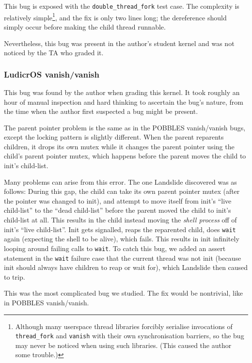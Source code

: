 This bug is exposed with the \texttt{double\_thread\_fork} test case. The complexity is relatively simple\footnote{
Although many userspace thread libraries forcibly serialise invocations of \texttt{thread\_fork} and \texttt{vanish} with their own synchronisation barriers, so the bug may never be noticed when using such libraries. (This caused the author some trouble.)},
and the fix is only two lines long; the dereference should simply occur before making the child thread runnable.

Nevertheless, this bug was present in the author's student kernel and was not noticed by the TA who graded it.

\subsubsection{LudicrOS vanish/vanish}
\label{sec:eval-ludicros-vanish}

This bug was found by the author when grading this kernel. It took roughly an hour of manual inspection and hard thinking to ascertain the bug's nature, from the time when the author first suspected a bug might be present.

The parent pointer problem is the same as in the POBBLES vanish/vanish bugs, except the locking pattern is slightly different. When the parent reparents children, it drops its own mutex while it changes the parent pointer using the child's parent pointer mutex, which happens before the parent moves the child to init's child-list.

Many problems can arise from this error. The one Landslide discovered was as follows: During this gap, the child can take its own parent pointer mutex (after the pointer was changed to init), and attempt to move itself from init's ``live child-list'' to the ``dead child-list'' before the parent moved the child to init's child-list at all. This results in the child instead moving the {\em shell process} off of init's ``live child-list''. Init gets signalled, reaps the reparented child, does \texttt{wait} again (expecting the shell to be alive), which fails. This results in init infinitely looping around failing calls to \texttt{wait}. To catch this bug, we added an assert statement in the \texttt{wait} failure case that the current thread was not init (because init should always have children to reap or wait for), which Landslide then caused to trip.

This was the most complicated bug we studied. The fix would be nontrivial, like in POBBLES vanish/vanish.

